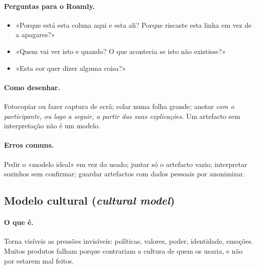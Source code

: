 \documentclass[11pt,a4paper]{article}
\begin{document}
\paragraph{Perguntas para o Roamly.}
\begin{itemize}
  \item «Porque está esta coluna aqui e esta ali? Porque riscaste esta linha em vez de a apagares?»
  \item «Quem vai ver isto e quando? O que acontecia se isto não existisse?»
  \item «Esta cor quer dizer alguma coisa?»
\end{itemize}

\paragraph{Como desenhar.} Fotocopiar ou fazer captura de ecrã; colar numa folha grande; anotar \emph{com o participante, ou logo a seguir, a partir das suas explicações}. Um artefacto sem interpretação não é um modelo.

\paragraph{Erros comuns.} Pedir o «modelo ideal» em vez do usado; juntar só o artefacto vazio; interpretar sozinhos sem confirmar; guardar artefactos com dados pessoais por anonimizar.

\subsection{Modelo cultural (\emph{cultural model})}

\paragraph{O que é.} Torna visíveis as pressões invisíveis: políticas, valores, poder, identidade, emoções. Muitos produtos falham porque contrariam a cultura de quem os usaria, e não por estarem mal feitos.
\end{document}

